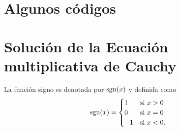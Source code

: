 \section*{Algunos códigos}

\section{Solución de la Ecuación multiplicativa de Cauchy}

La función signo es denotada por $\operatorname{sgn}(x)$ y definida como
\begin{align*}
\operatorname{sgn}(x)=\begin{cases}
1 & \text{si }x>0\\
0 & \text{si }x=0\\
-1 & \text{si }x<0.\\
\end{cases}
\end{align*}

